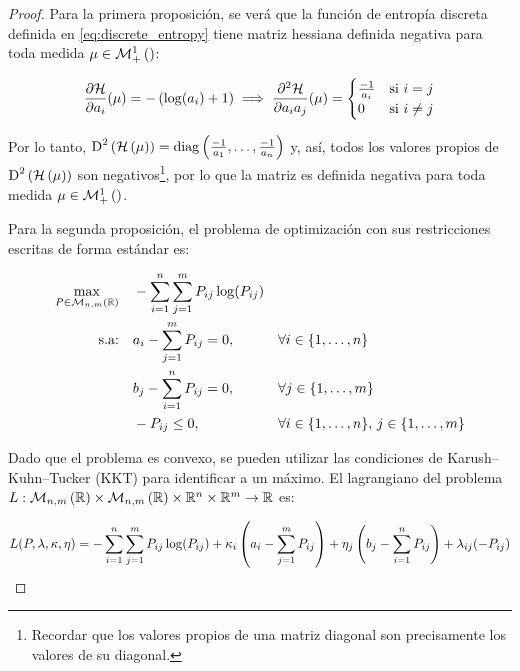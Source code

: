 \begin{proof}
	Para la primera proposición, se verá que la función de entropía discreta definida en \eqref{eq:discrete_entropy} tiene matriz hessiana definida negativa para toda medida $\mu\in\mathcal{M}_+^1\left(\right)$:

	\begin{equation*}
		\frac{\partial\mathcal{H}}{\partial a_i}(\mu) = -\left(\log(a_i) + 1\right)
		\implies \frac{\partial^2\mathcal{H}}{\partial a_i a_j}(\mu) =
		\begin{cases}
			\frac{-1}{a_i} & \text{si } i=j     \\
			0              & \text{si } i\neq j
		\end{cases}
	\end{equation*}

	Por lo tanto, $\operatorname{D}^2\left(\mathcal{H}\left(\mu\right)\right) = \operatorname{diag}\left(\frac{-1}{a_1},\ldots,\frac{-1}{a_n}\right)$ y, así, todos los valores propios de $\operatorname{D}^2\left(\mathcal{H}\left(\mu\right)\right)$ son negativos\footnote{Recordar que los valores propios de una matriz diagonal son precisamente los valores de su diagonal.}, por lo que la matriz es definida negativa para toda medida $\mu\in\mathcal{M}_+^1\left(\right)$.

	Para la segunda proposición, el problema de optimización con sus restricciones escritas de forma estándar es:

	\begin{alignat*}{3}
		\max_{P\in\mathcal{M}_{n,m}\left(\mathbb{R}\right)} \quad & -\sum_{i=1}^n \sum_{j=1}^m P_{ij}\log(P_{ij}) &  &                                                  \\
		\text{s.a:} \quad                      & a_i - \sum_{j=1}^m P_{ij} = 0,\quad           &  & \forall i\in\{1,\ldots,n\}                       \\
		                                       & b_j - \sum_{i=1}^n P_{ij} = 0,\quad           &  & \forall j\in\{1,\ldots,m\}                       \\
		                                       & -P_{ij}\leq 0, \quad                          &  & \forall i\in\{1,\ldots,n\},\, j\in\{1,\ldots,m\}
	\end{alignat*}

	Dado que el problema es convexo, se pueden utilizar las condiciones de Karush–Kuhn–Tucker (KKT) para identificar a un máximo. El lagrangiano del problema $L:\mathcal{M}_{n,m}\left(\mathbb{R}\right)\times\mathcal{M}_{n,m}\left(\mathbb{R}\right)\times\mathbb{R}^n\times\mathbb{R}^m\to\mathbb{R}$ es:

	\begin{equation*}
		L(P,\lambda,\kappa,\eta) =
		-\sum_{i=1}^n \sum_{j=1}^m P_{ij}\log(P_{ij})
		+ \kappa_i \left(a_i - \sum_{j=1}^m P_{ij}\right)
		+ \eta_j \left(b_j - \sum_{i=1}^n P_{ij}\right)
		+ \lambda_{ij}(-P_{ij})
	\end{equation*}


\end{proof}
